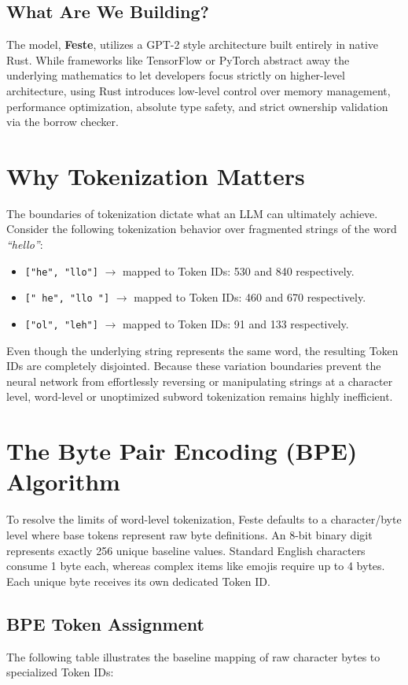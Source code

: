 \documentclass{article}
\begin{document}
\subsection{What Are We Building?}
The model, \textbf{Feste}, utilizes a GPT-2 style architecture built entirely in native Rust. While frameworks like TensorFlow or PyTorch abstract away the underlying mathematics to let developers focus strictly on higher-level architecture, using Rust introduces low-level control over memory management, performance optimization, absolute type safety, and strict ownership validation via the borrow checker.

\section{Why Tokenization Matters}
The boundaries of tokenization dictate what an LLM can ultimately achieve. Consider the following tokenization behavior over fragmented strings of the word \emph{``hello''}:
\begin{itemize}
    \item \texttt{["he", "llo"]} $\rightarrow$ mapped to Token IDs: 530 and 840 respectively.
    \item \texttt{[" he", "llo "]} $\rightarrow$ mapped to Token IDs: 460 and 670 respectively.
    \item \texttt{["ol", "leh"]} $\rightarrow$ mapped to Token IDs: 91 and 133 respectively.
\end{itemize}
Even though the underlying string represents the same word, the resulting Token IDs are completely disjointed. Because these variation boundaries prevent the neural network from effortlessly reversing or manipulating strings at a character level, word-level or unoptimized subword tokenization remains highly inefficient.

\section{The Byte Pair Encoding (BPE) Algorithm}
To resolve the limits of word-level tokenization, Feste defaults to a character/byte level where base tokens represent raw byte definitions. An 8-bit binary digit represents exactly 256 unique baseline values. Standard English characters consume 1 byte each, whereas complex items like emojis require up to 4 bytes. Each unique byte receives its own dedicated Token ID.

\subsection{BPE Token Assignment}
The following table illustrates the baseline mapping of raw character bytes to specialized Token IDs:
\end{document}
